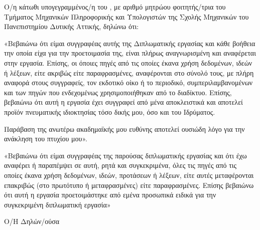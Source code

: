 %
%
%
%

Ο/η κάτωθι υπογεγραμμένος/η \thAuthorEL{} του \dotfill{}, με αριθμό
μητρώου \thAM{} φοιτητής/τρια του Τμήματος Μηχανικών Πληροφορικής και
Υπολογιστών της Σχολής Μηχανικών του Πανεπιστημίου Δυτικής Αττικής,
δηλώνω ότι:

«Βεβαιώνω ότι είμαι συγγραφέας αυτής της Διπλωματικής εργασίας και κάθε
βοήθεια την οποία είχα για την προετοιμασία της, είναι πλήρως
αναγνωρισμένη και αναφέρεται στην εργασία. Επίσης, οι όποιες πηγές από
τις οποίες έκανα χρήση δεδομένων, ιδεών ή λέξεων, είτε ακριβώς είτε
παραφρασμένες, αναφέρονται στο σύνολό τους, με πλήρη αναφορά στους
συγγραφείς, τον εκδοτικό οίκο ή το περιοδικό, συμπεριλαμβανομένων και
των πηγών που ενδεχομένως χρησιμοποιήθηκαν από το διαδίκτυο. Επίσης,
βεβαιώνω ότι αυτή η εργασία έχει συγγραφεί από μένα αποκλειστικά και
αποτελεί προϊόν πνευματικής ιδιοκτησίας τόσο δικής μου, όσο και του
Ιδρύματος.

Παράβαση της ανωτέρω ακαδημαϊκής μου ευθύνης αποτελεί ουσιώδη λόγο για
την ανάκληση του πτυχίου μου».

«Βεβαιώνω ότι είμαι συγγραφέας της παρούσας διπλωματικής εργασίας και
ότι έχω αναφέρει ή παραπέμψει σε αυτή, ρητά και συγκεκριμένα, όλες τις
πηγές από τις οποίες έκανα χρήση δεδομένων, ιδεών, προτάσεων ή λέξεων,
είτε αυτές μεταφέρονται επακριβώς (στο πρωτότυπο ή μεταφρασμένες) είτε
παραφρασμένες. Επίσης βεβαιώνω ότι αυτή η εργασία προετοιμάστηκε από
εμένα προσωπικά ειδικά για την συγκεκριμένη διπλωματική εργασία»

\begin{center}
Ο/Η Δηλών/ούσα
\end{center}

\begin{center}
\thAuthorEL
\end{center}
